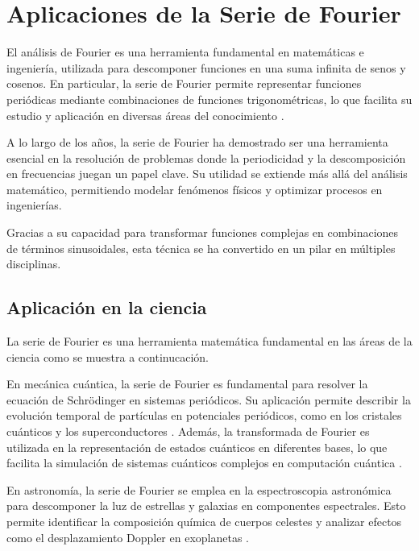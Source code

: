 {\section{Aplicaciones de la Serie de Fourier}

El análisis de Fourier es una herramienta fundamental en matemáticas e ingeniería, utilizada para descomponer funciones en una suma infinita de senos y cosenos. En particular, la serie de Fourier permite representar funciones periódicas mediante combinaciones de funciones trigonométricas, lo que facilita su estudio y aplicación en diversas áreas del conocimiento \cite{Oppenheim1999}.
\vspace{10pt}

A lo largo de los años, la serie de Fourier ha demostrado ser una herramienta esencial en la resolución de problemas donde la periodicidad y la descomposición en frecuencias juegan un papel clave. Su utilidad se extiende más allá del análisis matemático, permitiendo modelar fenómenos físicos y optimizar procesos en ingenierías. 
\vspace{10pt}

Gracias a su capacidad para transformar funciones complejas en combinaciones de términos sinusoidales, esta técnica se ha convertido en un pilar en múltiples disciplinas.



\subsection{Aplicación en la ciencia}

La serie de Fourier es una herramienta matemática fundamental en las áreas de la ciencia como se muestra a continucación.
\vspace{10pt}

En mecánica cuántica, la serie de Fourier es fundamental para resolver la ecuación de Schrödinger en sistemas periódicos. Su aplicación permite describir la evolución temporal de partículas en potenciales periódicos, como en los cristales cuánticos y los superconductores \cite{griffiths2018introduction}. Además, la transformada de Fourier es utilizada en la representación de estados cuánticos en diferentes bases, lo que facilita la simulación de sistemas cuánticos complejos en computación cuántica \cite{nielsen2010quantum}.
\vspace{10pt}

En astronomía, la serie de Fourier se emplea en la espectroscopia astronómica para descomponer la luz de estrellas y galaxias en componentes espectrales. Esto permite identificar la composición química de cuerpos celestes y analizar efectos como el desplazamiento Doppler en exoplanetas \cite{bracewell2003fourier}. 
\vspace{10pt}

}
